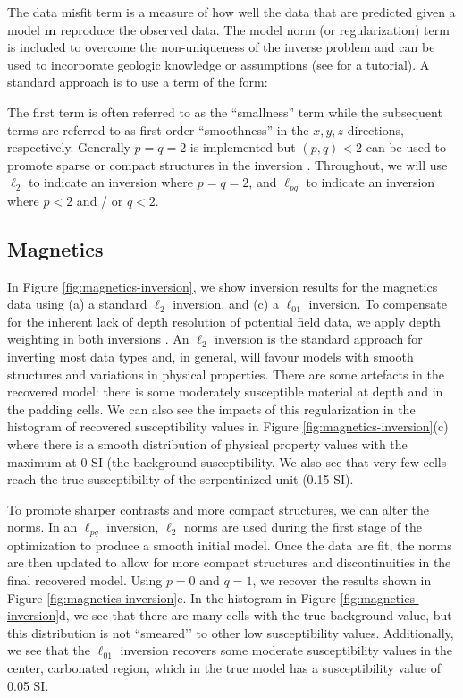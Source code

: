 \documentclass[
    paper,
  ]{geophysics}
\begin{document}

The data misfit term is a measure of how well the data that are predicted given a model $\mathbf{m}$ reproduce the observed data. The model norm (or regularization) term is included to overcome the non-uniqueness of the inverse problem and can be used to incorporate geologic knowledge or assumptions (see \cite{Oldenburg2005} for a tutorial). A standard approach is to use a term of the form:


The first term is often referred to as the ``smallness'' term while the subsequent terms are referred to as first-order ``smoothness'' in the $x, y, z$ directions, respectively. Generally $p=q=2$ is implemented but $(p,q)<2$ can be used to promote sparse or compact structures in the inversion \citep{Fournier2019}. Throughout, we will use $\ell_2$ to indicate an inversion where $p=q=2$, and $\ell_{pq}$ to indicate an inversion where $p<2$ and / or $q<2$.

\subsection{Magnetics}
In Figure \ref{fig:magnetics-inversion}, we show inversion results for the magnetics data using (a) a standard $\ell_2$ inversion, and (c) a $\ell_{01}$ inversion. To compensate for the inherent lack of depth resolution of potential field data, we apply depth weighting in both inversions \cite{Li1996}. An $\ell_2$ inversion is the standard approach for inverting most data types and, in general, will favour models with smooth structures and variations in physical properties. There are some artefacts in the recovered model: there is some moderately susceptible material at depth and in the padding cells. We can also see the impacts of this regularization in the histogram of recovered susceptibility values in Figure \ref{fig:magnetics-inversion}(c) where there is a smooth distribution of physical property values with the maximum at 0 SI (the background susceptibility. We also see that very few cells reach the true susceptibility of the serpentinized unit (0.15 SI).

To promote sharper contrasts and more compact structures, we can alter the norms. In an $\ell_{pq}$ inversion, $\ell_2$ norms are used during the first stage of the optimization to produce a smooth initial model. Once the data are fit, the norms are then updated to allow for more compact structures and discontinuities in the final recovered model. Using $p=0$ and $q=1$, we recover the results shown in Figure \ref{fig:magnetics-inversion}c. In the histogram in Figure \ref{fig:magnetics-inversion}d, we see that there are many cells with the true background value, but this distribution is not ``smeared'’ to other low susceptibility values. Additionally, we see that the $\ell_{01}$ inversion recovers some moderate susceptibility values in the center, carbonated region, which in the true model has a susceptibility value of 0.05 SI.
\end{document}
